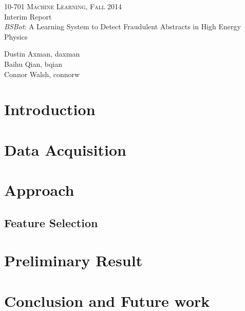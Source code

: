 \documentclass[11pt]{article}
\begin{document}
\clearpage
\thispagestyle{empty}
\vspace*{0px}
\begin{center}
	\textsc{10-701 Machine Learning, Fall 2014}\\
	\large{Interim Report}\\
	\vspace{10px}
	\large{\emph{BSBot}: A Learning System to Detect Fraudulent Abstracts in High Energy Physics} \\
	\vspace{10px}
	\normalsize{ 
		
		Dustin Axman, daxman\\
		Baihu Qian, bqian\\
		Connor Walsh, connorw\\
	 }

\end{center}

\section{Introduction}

%

\section{Data Acquisition}


\section{Approach}
\subsection{Feature Selection}


\section{Preliminary Result}


\section{Conclusion and Future work}


%
%
\end{document}
